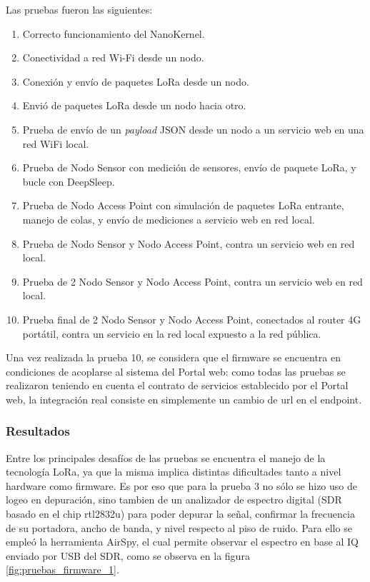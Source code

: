 Las pruebas fueron las siguientes:

\begin{enumerate}
    \item Correcto funcionamiento del NanoKernel.
    \item Conectividad a red Wi-Fi desde un nodo.
    \item Conexión y envío de paquetes LoRa desde un nodo.
    \item Envió de paquetes LoRa desde un nodo hacia otro.
    \item Prueba de envío de un \textit{payload} JSON desde un nodo a un servicio web en una red WiFi local.
    \item Prueba de Nodo Sensor con medición de sensores, envío de paquete LoRa, y bucle con DeepSleep.
    \item Prueba de Nodo Access Point  con simulación de paquetes LoRa entrante, manejo de colas, y envío de mediciones a servicio web en red local.
    \item Prueba de Nodo Sensor y Nodo Access Point, contra un servicio web en red local.
    \item Prueba de 2 Nodo Sensor y Nodo Access Point, contra un servicio web en red local.
    \item Prueba final de 2 Nodo Sensor y Nodo Access Point, conectados al router 4G portátil, contra un servicio en la red local expuesto a la red pública.
\end{enumerate}

Una vez realizada la prueba 10, se considera que el firmware se encuentra en condiciones de acoplarse al sistema del Portal web: como todas las pruebas se realizaron teniendo en cuenta el contrato de servicios establecido por el Portal web, la integración real consiste en simplemente un cambio de url en el endpoint.

\subsubsection{Resultados}

Entre los principales desafíos de las pruebas se encuentra el manejo de la tecnología LoRa, ya que la misma implica distintas dificultades tanto a nivel hardware como firmware.
Es por eso que para la prueba 3 no sólo se hizo uso de logeo en depuración, sino tambien de un analizador de espectro digital (SDR basado en el chip rtl2832u) para poder depurar la señal, confirmar la frecuencia de su portadora, ancho de banda, y nivel respecto al piso de ruido. Para ello se empleó la herramienta AirSpy, el cual permite observar el espectro en base al IQ enviado por USB del SDR, como se observa en la figura \ref{fig:pruebas_firmware_1}.

